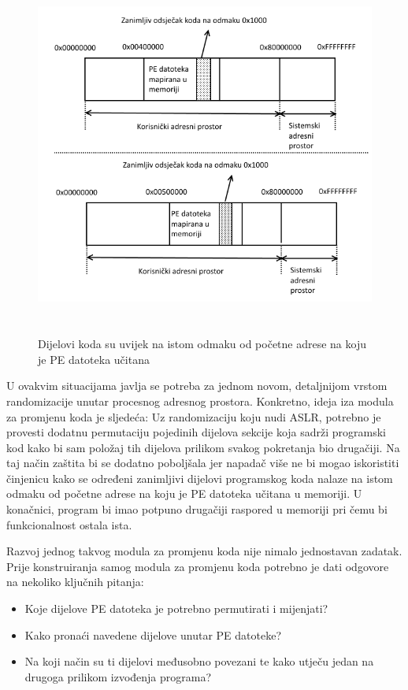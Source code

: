 \documentclass[times, utf8, diplomski, numeric]{fer}
\begin{document}
\begin{figure}[!htb]
\centering
\setlength\fboxsep{0pt}
\setlength\fboxrule{0.5pt}
\includegraphics[width=12cm, height=12cm]{slike/aslr_permutacija}
\caption{Dijelovi koda su uvijek na istom odmaku od početne adrese na koju je PE datoteka učitana}
\label{fig:aslr_permutacija} 
\end{figure}

U ovakvim situacijama javlja se potreba za jednom novom,
detaljnijom vrstom randomizacije unutar procesnog adresnog
prostora. Konkretno, ideja iza modula za promjenu koda je
sljedeća: Uz randomizaciju koju nudi ASLR, potrebno je provesti
dodatnu permutaciju pojedinih dijelova sekcije koja sadrži
programski kod kako bi sam položaj tih dijelova prilikom svakog
pokretanja bio drugačiji. Na taj način zaštita bi se dodatno
poboljšala jer napadač više ne bi mogao iskoristiti činjenicu
kako se određeni zanimljivi dijelovi programskog koda nalaze na			%
istom odmaku od početne adrese na koju je PE datoteka učitana u
memoriji. U konačnici, program bi imao potpuno drugačiji raspored
u memoriji pri čemu bi funkcionalnost ostala ista.

Razvoj jednog takvog modula za promjenu koda nije nimalo
jednostavan zadatak. Prije konstruiranja samog modula za promjenu
koda potrebno je dati odgovore na nekoliko ključnih pitanja:

\begin{itemize}
\item Koje dijelove PE datoteka je potrebno permutirati i mijenjati?
\item Kako pronaći navedene dijelove unutar PE datoteke?
\item Na koji način su ti dijelovi međusobno povezani te kako utječu jedan na drugoga prilikom izvođenja programa?
\end{itemize}
\end{document}
